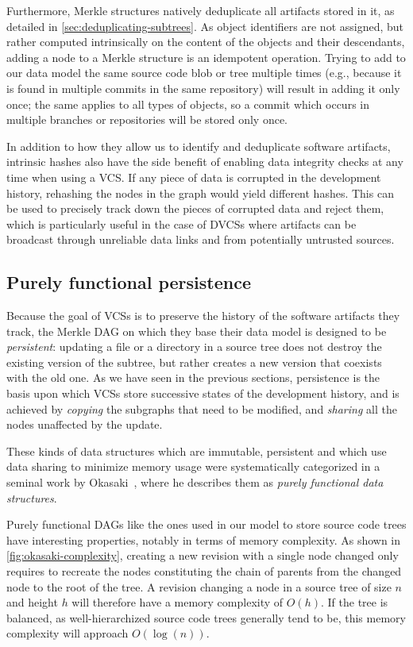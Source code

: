 Furthermore, Merkle structures natively deduplicate all artifacts stored in it,
as detailed in \cref{sec:deduplicating-subtrees}.  As object identifiers are
not assigned, but rather computed intrinsically on the content of the objects
and their descendants, adding a node to a Merkle structure is an idempotent
operation. Trying to add to our data model the same source code blob or tree
multiple times (e.g., because it is found in multiple commits in the same
repository) will result in adding it only once; the same applies to all types
of objects, so a commit which occurs in multiple branches or repositories
will be stored only once.

In addition to how they allow us to identify and deduplicate software
artifacts, intrinsic hashes also have the side benefit of enabling data
integrity checks at any time when using a \gls{VCS}. If any piece of data is
corrupted in the development history, rehashing the nodes in the graph would
yield different hashes. This can be used to precisely track down the pieces of
corrupted data and reject them, which is particularly useful in the case of
\glspl{DVCS} where artifacts can be broadcast through unreliable data links and
from potentially untrusted sources.

\subsection{Purely functional persistence}
\label{sec:purely-functional}

Because the goal of \glspl{VCS} is to preserve the history of the software
artifacts they track, the Merkle DAG on which they base their data model is
designed to be \emph{persistent}: updating a file or a directory in a source
tree does not destroy the existing version of the subtree, but rather creates a
new version that coexists with the old one. As we have seen in the previous
sections, persistence is the basis upon which \glspl{VCS} store successive
states of the development history, and is achieved by \emph{copying} the
subgraphs that need to be modified, and \emph{sharing} all the nodes unaffected
by the update.

These kinds of data structures which are immutable, persistent and which use
data sharing to minimize memory usage were systematically categorized in a
seminal work by Okasaki~\cite{okasaki1999purely}, where he describes them as
\emph{purely functional data structures}.

Purely functional \glspl{DAG} like the ones used in our model to store source
code trees have interesting properties, notably in terms of memory complexity.
As shown in \cref{fig:okasaki-complexity}, creating a new revision with a
single node changed only requires to recreate the nodes constituting the chain
of parents from the changed node to the root of the tree. A revision changing a
node in a source tree of size $n$ and height $h$ will therefore have a memory
complexity of $O(h)$. If the tree is balanced, as well-hierarchized source code
trees generally tend to be, this memory complexity will approach $O(\log(n))$.

